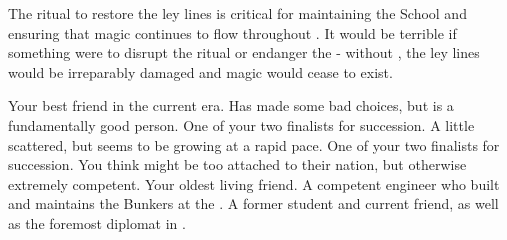 \documentclass[char]{GL2020}
\begin{document}
\begin{itemz}[Notes]
	\item The ritual to restore the ley lines is critical for maintaining the School and ensuring that magic continues to flow throughout \pEarth{}.  It would be terrible if something were to disrupt the ritual or endanger the \pSc{} - without \pSc{}, the ley lines would be irreparably  damaged and magic would cease to exist.
\end{itemz}

\begin{contacts}
	\contact{\cChupAvenger{}} Your best friend in the current era. Has made some bad choices, but is a fundamentally good person.
	\contact{\cMusic{}} One of your two finalists for succession. A little scattered, but seems to be growing at a rapid pace.
	\contact{\cBeetle{}} One of your two finalists for succession. You think \cBeetle{\they} might be too attached to their nation, but \cBeetle{\theyare} otherwise extremely competent.
	\contact{\cBunker{}} Your oldest living friend. A competent engineer who built and maintains the Bunkers at the \pSc{}.
	\contact{\cDiplomat{}} A former student and current friend, as well as the foremost diplomat in \pTech{}.
\end{contacts}
\end{document}
